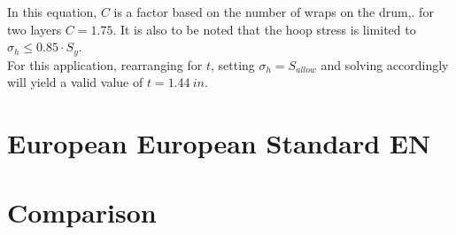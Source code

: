 In this equation, $C$ is a factor based on the number of wraps on the drum,. for two layers $C=1.75$. It is also to be noted that the hoop stress is limited to $\sigma_h \leq 0.85\cdot S_y$. \\

For this application, rearranging for $t$, setting $\sigma_h = S_{allow}$ and solving accordingly will yield a valid value of $t = 1.44 \ in$. 

\section{European European Standard EN}

\section{Comparison}


